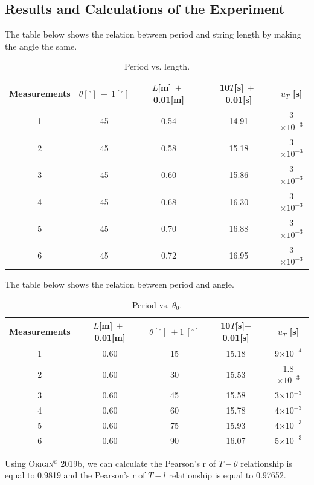 \documentclass[12pt]{report}
\begin{document}
\subsection{Results and Calculations of the Experiment}
The table below shows the relation between period and string length by making the angle the same.
\begin{table}[H]
        \centering
        \begin{tabular}{|c|c|c|c|c|}
                \hline
                Measurements & $\theta[^\circ]\ \pm\ 1[^\circ]$ & $L$[m]$\ \pm\ $0.01[m] & 10$T$[s]$\ \pm\ $0.01[s] &$u_T$ [s]\\
                \hline
                1 & 45 & 0.54 & 14.91 & 3$\times10^{-3}$\\
                \hline
                2 & 45 & 0.58 & 15.18 & 3$\times10^{-3}$\\
                \hline
                3 & 45 & 0.60 & 15.86 & 3$\times10^{-3}$\\
                \hline
                4 & 45 & 0.68 & 16.30 & 3$\times10^{-3}$\\
                \hline
                5 & 45 & 0.70 & 16.88 & 3$\times10^{-3}$\\
                \hline
                6 & 45 & 0.72 & 16.95 & 3$\times10^{-3}$\\
                \hline
        \end{tabular}
        \caption{Period vs. length.}
\end{table}
The table below shows the relation between period and angle.
\begin{table}[H]
        \centering
        \begin{tabular}{|c|c|c|c|c|}
                \hline
                Measurements & $L$[m]$\ \pm\ $0.01[m] & $\theta[^\circ]\ \pm1\ [^\circ]$ & 10$T$[s]$\pm$0.01[s] &$u_T$ [s]\\
                \hline
                1 & 0.60 & 15 & 15.18 & 9$\times10^{-4}$\\
                \hline
                2 & 0.60 & 30 & 15.53 & 1.8$\times10^{-3}$\\
                \hline
                3 & 0.60 & 45 & 15.58 & 3$\times10^{-3}$\\
                \hline
                4 & 0.60 & 60 & 15.78 & 4$\times10^{-3}$\\
                \hline
                5 & 0.60 & 75 & 15.93 & 4$\times10^{-3}$\\
                \hline
                6 & 0.60 & 90 & 16.07 & 5$\times10^{-3}$\\
                \hline
        \end{tabular}
        \caption{Period vs. $\theta_0$.}
\end{table}
Using \textsc{Origin}$^{\circledR}$ 2019b, we can calculate the Pearson's r of $T-\theta$ relationship is equal to 0.9819 and the Pearson's r of $T-l$ relationship is equal to 0.97652.
\end{document}
